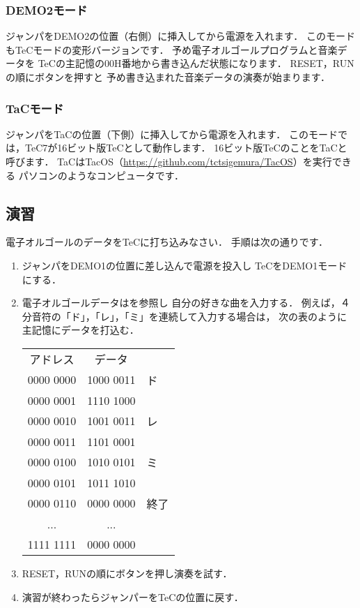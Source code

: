 \subsubsection{DEMO2モード}
ジャンパをDEMO2の位置（右側）に挿入してから電源を入れます．
このモードもTeCモードの変形バージョンです．
予め電子オルゴールプログラムと音楽データを
TeCの主記憶の00H番地から書き込んだ状態になります．
RESET，RUNの順にボタンを押すと
予め書き込まれた音楽データの演奏が始まります．

\subsubsection{TaCモード}
ジャンパをTaCの位置（下側）に挿入してから電源を入れます．
このモードでは，TeC7が16ビット版TeCとして動作します．
16ビット版TeCのことをTaCと呼びます．
TaCはTacOS（\url{https://github.com/tctsigemura/TacOS}）を実行できる
パソコンのようなコンピュータです．

\subsection*{演習}

電子オルゴールのデータをTeCに打ち込みなさい．
手順は次の通りです．

\begin{enumerate}
\item ジャンパをDEMO1の位置に差し込んで電源を投入し
  TeCをDEMO1モードにする．
\item 電子オルゴールデータはを参照し
  自分の好きな曲を入力する．
  例えば，４分音符の「ド」，「レ」，「ミ」を連続して入力する場合は，
  次の表のように主記憶にデータを打込む．

  {\ttfamily\small\begin{center}
    \begin{tabular}{| c | c | l }\cline{1-2}
      アドレス  & データ \\\cline{1-2}
      0000 0000 & 1000 0011 & ド   \\
      0000 0001 & 1110 1000 &      \\
      0000 0010 & 1001 0011 & レ   \\
      0000 0011 & 1101 0001 &      \\
      0000 0100 & 1010 0101 & ミ   \\
      0000 0101 & 1011 1010 &      \\
      0000 0110 & 0000 0000 & 終了 \\
      ...     &   ...     &      \\
      1111 1111 & 0000 0000 &      \\\cline{1-2}
    \end{tabular}
  \end{center}}

\item RESET，RUNの順にボタンを押し演奏を試す．

\item 演習が終わったらジャンパーをTeCの位置に戻す．
\end{enumerate}
